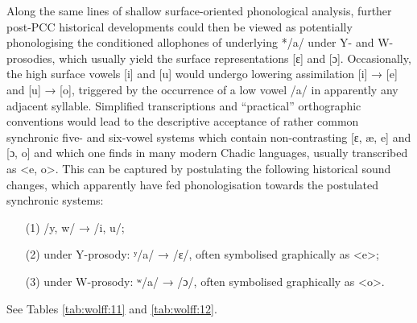 \documentclass[output=paper]{langscibook}
\begin{document}
\begin{table}
\caption{After apparent phonologisation I: Surface-level vowel inventories in modern CC languages}
\label{tab:wolff:10}
\end{table}

Along the same lines of shallow surface-oriented phonological analysis, further post-PCC historical developments could then be viewed as potentially phonologising the conditioned allophones of underlying */a/ under Y- and W-pros\-o\-dies, which usually yield the surface representations [ɛ] and [ɔ]. Occasionally, the high surface vowels [i] and [u] would undergo lowering assimilation [i] → [e] and [u] → [o], triggered by the occurrence of a low vowel /a/ in apparently any adjacent syllable. Simplified transcriptions and ``practical'' orthographic conventions would lead to the descriptive acceptance of rather common synchronic five- and six-vowel systems which contain non-contrasting [ɛ, æ, e] and [ɔ, o] and which one finds in many modern Chadic languages, usually transcribed as <e, o>. This can be captured by postulating the following historical sound changes, which apparently have fed phonologisation towards the postulated synchronic systems:

\begin{itemize}
\item[(1)]  /y, w/ → /i, u/; 
\item[(2)] under Y-prosody: ʸ/a/ → /ε/, often symbolised graphically as <e>;
\item[(3)] under W-prosody: ʷ/a/ → /ɔ/, often symbolised graphically as <o>.
\end{itemize}

See Tables \ref{tab:wolff:11} and \ref{tab:wolff:12}.
\end{document}
